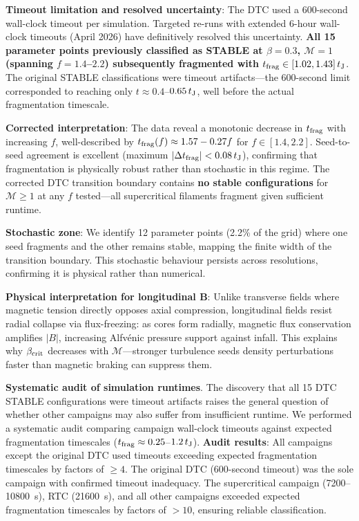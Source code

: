 \documentclass[twocolumn]{mnras}
\begin{document}
\textbf{Timeout limitation and resolved uncertainty}: The DTC used a 600-second wall-clock timeout per simulation. Targeted re-runs with extended 6-hour wall-clock timeouts (April 2026) have definitively resolved this uncertainty. \textbf{All 15 parameter points previously classified as STABLE at $\beta = 0.3$, $\mathcal{M} = 1$ (spanning $f = 1.4$--$2.2$) subsequently fragmented with $t_{\rm frag} \in [1.02, 1.43]\,t_{\rm J}$}. The original STABLE classifications were timeout artifacts—the 600-second limit corresponded to reaching only $t \approx 0.4$--$0.65\,t_{\rm J}$, well before the actual fragmentation timescale.

\textbf{Corrected interpretation}: The data reveal a monotonic decrease in $t_{\rm frag}$ with increasing $f$, well-described by $t_{\rm frag}(f) \approx 1.57 - 0.27f$ for $f \in [1.4, 2.2]$. Seed-to-seed agreement is excellent (maximum $|\Delta t_{\rm frag}| < 0.08\,t_{\rm J}$), confirming that fragmentation is physically robust rather than stochastic in this regime. The corrected DTC transition boundary contains \textbf{no stable configurations} for $\mathcal{M} \geq 1$ at any $f$ tested—all supercritical filaments fragment given sufficient runtime.

\textbf{Stochastic zone}: We identify 12 parameter points (2.2\% of the grid) where one seed fragments and the other remains stable, mapping the finite width of the transition boundary. This stochastic behaviour persists across resolutions, confirming it is physical rather than numerical.

\textbf{Physical interpretation for longitudinal B}: Unlike transverse fields where magnetic tension directly opposes axial compression, longitudinal fields resist radial collapse via flux-freezing: as cores form radially, magnetic flux conservation amplifies $|B|$, increasing Alfv\'enic pressure support against infall. This explains why $\beta_{\rm crit}$ decreases with $\mathcal{M}$---stronger turbulence seeds density perturbations faster than magnetic braking can suppress them.

\textbf{Systematic audit of simulation runtimes}. The discovery that all 15 DTC STABLE configurations were timeout artifacts raises the general question of whether other campaigns may also suffer from insufficient runtime. We performed a systematic audit comparing campaign wall-clock timeouts against expected fragmentation timescales ($t_{\rm frag} \approx 0.25$--$1.2\,t_{\rm J}$). \textbf{Audit results}: All campaigns except the original DTC used timeouts exceeding expected fragmentation timescales by factors of $\geq 4$. The original DTC (600-second timeout) was the sole campaign with confirmed timeout inadequacy. The supercritical campaign (7200--10800~s), RTC (21600~s), and all other campaigns exceeded expected fragmentation timescales by factors of $>10$, ensuring reliable classification.
\end{document}
